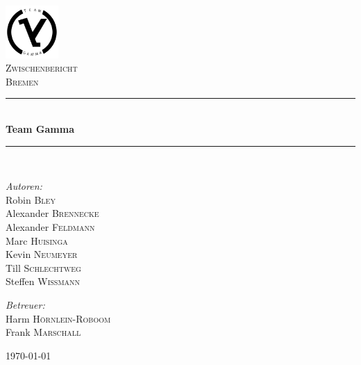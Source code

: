 \documentclass{article}
\begin{document}
\begin{titlepage}

\begin{center}


\includegraphics[width=0.15\textwidth]{./Files/logo.png}\\[1cm]    

\textsc{\LARGE Zwischenbericht}\\[1.5cm]

\textsc{\Large Bremen}\\[0.5cm]


\newcommand{\HRule}{\rule{\linewidth}{0.5mm}}
\HRule \\[0.4cm]
{ \huge \bfseries Team Gamma}\\[0.4cm]

\HRule \\[1.5cm]

\begin{minipage}{0.4\textwidth}
\begin{flushleft} \large
\emph{Autoren:}\\
Robin \textsc{Bley}\\
Alexander \textsc{Brennecke}\\
Alexander \textsc{Feldmann}\\
Marc \textsc{Huisinga}\\
Kevin \textsc{Neumeyer}\\
Till \textsc{Schlechtweg}\\
Steffen \textsc{Wißmann}
\end{flushleft}
\end{minipage}
\hfill
\begin{minipage}{0.4\textwidth}
\begin{flushright} \large
\emph{Betreuer:} \\
Harm \textsc{Hörnlein-Roboom}\\
Frank \textsc{Marschall}
\end{flushright}
\end{minipage}

\vfill

{\large \today}

\end{center}

\end{titlepage}
\end{document}

